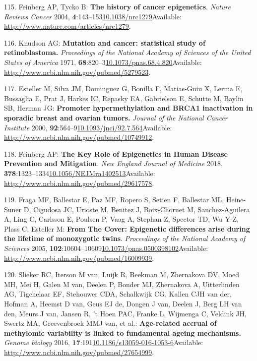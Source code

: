 \documentclass[
]{book}
\begin{document}
\leavevmode\hypertarget{ref-Feinberg2004}{}%
115. Feinberg AP, Tycko B: \textbf{The history of cancer epigenetics}. \emph{Nature Reviews Cancer} 2004, \textbf{4}:143--153\href{https://doi.org/10.1038/nrc1279}{10.1038/nrc1279}Available: \url{http://www.nature.com/articles/nrc1279}.

\leavevmode\hypertarget{ref-Knudson1971}{}%
116. Knudson AG: \textbf{Mutation and cancer: statistical study of retinoblastoma.} \emph{Proceedings of the National Academy of Sciences of the United States of America} 1971, \textbf{68}:820--3\href{https://doi.org/10.1073/pnas.68.4.820}{10.1073/pnas.68.4.820}Available: \url{http://www.ncbi.nlm.nih.gov/pubmed/5279523}.

\leavevmode\hypertarget{ref-Esteller2000}{}%
117. Esteller M, Silva JM, Dominguez G, Bonilla F, Matias-Guiu X, Lerma E, Bussaglia E, Prat J, Harkes IC, Repasky EA, Gabrielson E, Schutte M, Baylin SB, Herman JG: \textbf{Promoter hypermethylation and BRCA1 inactivation in sporadic breast and ovarian tumors.} \emph{Journal of the National Cancer Institute} 2000, \textbf{92}:564--9\href{https://doi.org/10.1093/jnci/92.7.564}{10.1093/jnci/92.7.564}Available: \url{http://www.ncbi.nlm.nih.gov/pubmed/10749912}.

\leavevmode\hypertarget{ref-Feinberg2018}{}%
118. Feinberg AP: \textbf{The Key Role of Epigenetics in Human Disease Prevention and Mitigation}. \emph{New England Journal of Medicine} 2018, \textbf{378}:1323--1334\href{https://doi.org/10.1056/NEJMra1402513}{10.1056/NEJMra1402513}Available: \url{http://www.ncbi.nlm.nih.gov/pubmed/29617578}.

\leavevmode\hypertarget{ref-Fraga2005}{}%
119. Fraga MF, Ballestar E, Paz MF, Ropero S, Setien F, Ballestar ML, Heine-Suner D, Cigudosa JC, Urioste M, Benitez J, Boix-Chornet M, Sanchez-Aguilera A, Ling C, Carlsson E, Poulsen P, Vaag A, Stephan Z, Spector TD, Wu Y-Z, Plass C, Esteller M: \textbf{From The Cover: Epigenetic differences arise during the lifetime of monozygotic twins}. \emph{Proceedings of the National Academy of Sciences} 2005, \textbf{102}:10604--10609\href{https://doi.org/10.1073/pnas.0500398102}{10.1073/pnas.0500398102}Available: \url{http://www.ncbi.nlm.nih.gov/pubmed/16009939}.

\leavevmode\hypertarget{ref-Slieker2016}{}%
120. Slieker RC, Iterson M van, Luijk R, Beekman M, Zhernakova DV, Moed MH, Mei H, Galen M van, Deelen P, Bonder MJ, Zhernakova A, Uitterlinden AG, Tigchelaar EF, Stehouwer CDA, Schalkwijk CG, Kallen CJH van der, Hofman A, Heemst D van, Geus EJ de, Dongen J van, Deelen J, Berg LH van den, Meurs J van, Jansen R, 't Hoen PAC, Franke L, Wijmenga C, Veldink JH, Swertz MA, Greevenbroek MMJ van, et al.: \textbf{Age-related accrual of methylomic variability is linked to fundamental ageing mechanisms.} \emph{Genome biology} 2016, \textbf{17}:191\href{https://doi.org/10.1186/s13059-016-1053-6}{10.1186/s13059-016-1053-6}Available: \url{http://www.ncbi.nlm.nih.gov/pubmed/27654999}.
\end{document}
